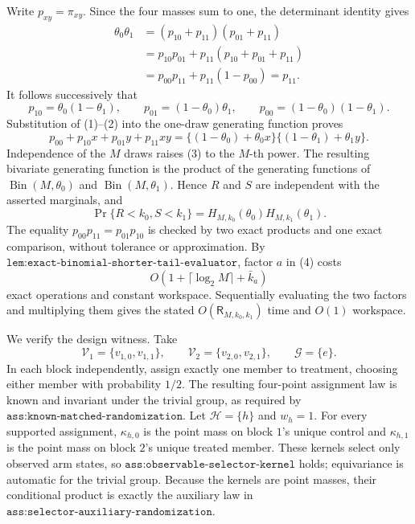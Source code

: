Write \(p_{xy}=\pi_{xy}\). Since the four masses sum to one, the determinant identity gives
\[
\begin{aligned}
\theta_0\theta_1
&=(p_{10}+p_{11})(p_{01}+p_{11})\\
&=p_{10}p_{01}+p_{11}(p_{10}+p_{01}+p_{11})\\
&=p_{00}p_{11}+p_{11}(1-p_{00})=p_{11}.
\end{aligned}
\tag{1}
\]
It follows successively that
\[
p_{10}=\theta_0(1-\theta_1),\qquad
p_{01}=(1-\theta_0)\theta_1,\qquad
p_{00}=(1-\theta_0)(1-\theta_1).
\tag{2}
\]
Substitution of (1)--(2) into the one-draw generating function proves
\[
p_{00}+p_{10}x+p_{01}y+p_{11}xy
=\{(1-\theta_0)+\theta_0x\}\{(1-\theta_1)+\theta_1y\}.
\tag{3}
\]
Independence of the \(M\) draws raises (3) to the \(M\)-th power. The resulting bivariate generating function is the product of the generating functions of \(\operatorname{Bin}(M,\theta_0)\) and \(\operatorname{Bin}(M,\theta_1)\). Hence \(R\) and \(S\) are independent with the asserted marginals, and
\[
\Pr\{R<k_0,S<k_1\}
=H_{M,k_0}(\theta_0)H_{M,k_1}(\theta_1).
\tag{4}
\]
The equality \(p_{00}p_{11}=p_{01}p_{10}\) is checked by two exact products and one exact comparison, without tolerance or approximation. By \(\texttt{lem:exact-binomial-shorter-tail-evaluator}\), factor \(a\) in (4) costs
\[
O\!\left(1+\lceil\log_2M\rceil+\bar k_a\right)
\]
exact operations and constant workspace. Sequentially evaluating the two factors and multiplying them gives the stated \(O(\mathsf R_{M,k_0,k_1})\) time and \(O(1)\) workspace.

We verify the design witness. Take
\[
\mathcal V_1=\{v_{1,0},v_{1,1}\},\qquad
\mathcal V_2=\{v_{2,0},v_{2,1}\},\qquad
\mathcal G=\{e\}.
\]
In each block independently, assign exactly one member to treatment, choosing either member with probability \(1/2\). The resulting four-point assignment law is known and invariant under the trivial group, as required by \(\texttt{ass:known-matched-randomization}\). Let \(\mathcal H=\{h\}\) and \(w_h=1\). For every supported assignment, \(\kappa_{h,0}\) is the point mass on block \(1\)'s unique control and \(\kappa_{h,1}\) is the point mass on block \(2\)'s unique treated member. These kernels select only observed arm states, so \(\texttt{ass:observable-selector-kernel}\) holds; equivariance is automatic for the trivial group. Because the kernels are point masses, their conditional product is exactly the auxiliary law in \(\texttt{ass:selector-auxiliary-randomization}\).

